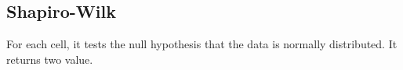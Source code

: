 \subsection{Shapiro-Wilk}
For each cell, it tests the null hypothesis that the data is normally distributed. It returns two value.